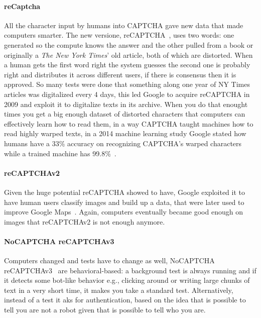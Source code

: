 \paragraph{reCaptcha}
All the character input by humans into CAPTCHA gave new data that made computers smarter.
The new versione, reCAPTCHA~\cite{ahn2008recaptcha}, uses two words: one generated so the compute knows the answer and the other pulled from a book or originally a \emph{The New York Times}' old article, both of which are distorted.
When a human gets the first word right the system guesses the second one is probably right and distributes it across different users, if there is consensus then it is approved.
So many tests were done that something along one year of NY Times articles was digitalized every 4 days, this led Google to acquire reCAPTCHA in 2009 and exploit it to digitalize texts in its archive.
When you do that enought times you get a big enough dataset of distorted characters that computers can effectively learn how to read them, in a way CAPTCHA taught machines how to read highly warped texts, in a 2014 machine learning study Google stated how humans have a 33\% accuracy on recognizing CAPTCHA's warped characters while a trained machine has 99.8\%~\cite{google2014recaptcha}.

\paragraph{reCAPTCHAv2}
Given the huge potential reCAPTCHA showed to have, Google exploited it to have human users classify images and build up a data, that were later used to improve Google Maps~\cite{vox2021captcha}.
Again, computers eventually became good enough on images that reCAPTCHAv2 is not enough anymore.

\paragraph{NoCAPTCHA reCAPTCHAv3}
Computers changed and tests have to change as well, NoCAPTCHA reCAPTCHAv3~\cite{google2014nocaptcha} are behavioral-based: a background test is always running and if it detects some bot-like behavior e.g., clicking around or writing large chunks of text in a very short time, it makes you take a standard test.
Alternatively, instead of a test it aks for authentication, based on the idea that is possible to tell you are not a robot given that is possible to tell who you are.

